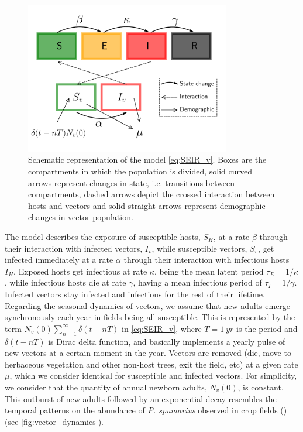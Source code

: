 \begin{figure}[H]
    \centering
    \includegraphics[width=0.8\textwidth]{Figures/SEIR_v_scheme.pdf}
    \caption{Schematic representation of the model \cref{eq:SEIR_v}. Boxes
        are the compartments in which the population is divided, solid curved
        arrows
        represent changes in state, i.e. transitions between compartments,
        dashed
        arrows depict the crossed interaction between hosts and vectors and
        solid
        straight arrows represent demographic changes in vector population.}
    \label{fig:model_diagram}
\end{figure}

The model describes the exposure of susceptible hosts, $S_H$, at a rate
$\beta$ through their interaction with infected vectors, $I_v$, while
susceptible vectors, $S_v$, get infected immediately at a rate $\alpha$ through
their interaction with infectious hosts $I_H$. Exposed hosts get infectious at
rate $\kappa$, being the mean latent period $\tau_E=1/\kappa$, while infectious
hosts die at rate $\gamma$, having a mean infectious period of
$\tau_I=1/\gamma$. Infected vectors stay infected and infectious for the rest
of their lifetime. Regarding the seasonal dynamics of vectors, we assume that
new adults emerge synchronously each year in fields being all susceptible. This
is represented by the term $N_v(0)\sum_{n=1}^{\infty}\delta(t-nT)$ in
\cref{eq:SEIR_v}, where $T=\SI{1}{yr}$ is the period and $\delta(t-nT)$ is
Dirac delta function, and basically implements a yearly pulse of new vectors at
a certain moment in the year. Vectors are removed (die, move to herbaceous
vegetation and other non-host trees, exit the field, etc) at a given rate
$\mu$, which we consider identical for susceptible and infected vectors. For
simplicity, we consider that the quantity of annual newborn adults, $N_v(0)$,
is constant. This outburst of new adults followed by an exponential decay
resembles the temporal patterns on the abundance of \textit{P. spumarius}
observed in crop fields  (\cite{Antonatos2021,Beal2021,Cornara2017,Lopez2021})
(see \cref{fig:vector_dynamics}).

